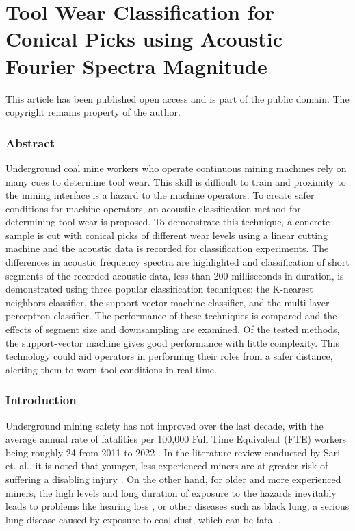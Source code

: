 
\chapter{Tool Wear Classification for Conical Picks
using Acoustic Fourier Spectra Magnitude \label{chap:P2}}

\begin{center}
This article has been published open access and is part of the public domain.
The copyright remains property of the author.
\end{center}

\subsection{Abstract}

Underground coal mine workers who operate continuous mining machines rely on many cues to determine tool wear. 
This skill is difficult to train and proximity to the mining interface is a hazard to the machine operators. 
To create safer conditions for machine operators, an acoustic classification method for determining tool wear is proposed. 
To demonstrate this technique, a concrete sample is cut with conical picks of different wear levels 
using a linear cutting machine and the acoustic data is recorded for classification experiments. 
The differences in acoustic frequency spectra are highlighted and classification of short segments 
of the recorded acoustic data, less than 200 milliseconds in duration, is demonstrated using 
three popular classification techniques: the K-nearest neighbors classifier, the support-vector machine classifier, 
and the multi-layer perceptron classifier. The performance of these techniques is compared and 
the effects of segment size and downsampling are examined. Of the tested methods, the support-vector machine 
gives good performance with little complexity. This technology could aid operators in performing their 
roles from a safer distance, alerting them to worn tool conditions in real time.


\subsection{Introduction}\label{sec1}

Underground mining safety has not improved over the last decade, with the average annual rate of fatalities
per 100,000 Full Time Equivalent (FTE) workers being roughly 24 from 2011 to 2022 \cite{nioshdata}. 
In the literature review conducted by Sari et. al., it is noted that younger, less experienced
miners are at greater risk of suffering a disabling injury \cite{Sari2004}.
On the other hand, for older and more experienced miners, 
the high levels and long duration of exposure to the hazards inevitably leads to problems
like hearing loss \cite{Erol2022}, or other diseases such as black lung, 
a serious lung disease caused by exposure to coal dust, which can be fatal \cite{Colinent2020}.


